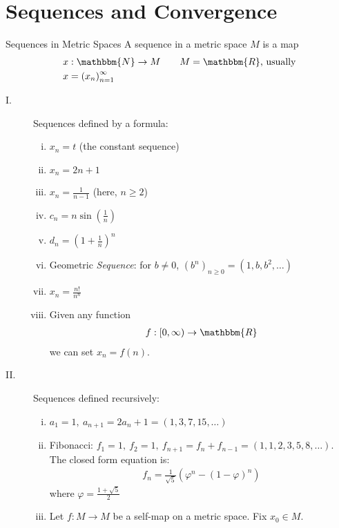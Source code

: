 \documentclass[10pt]{extarticle}
\newcommand{\N}{\mathbbm{N}}
\newcommand{\R}{\mathbbm{R}}
\begin{document}
  \section{Sequences and Convergence}%
  \begin{problem}{Sequences in Metric Spaces}
    A sequence in a metric space $M$ is a map
    \begin{align*}
      x&: \N \rightarrow M \tag*{$M = \R$, usually}\\
      x &= \left(x_n\right)_{n=1}^{\infty}
    \end{align*}
    \begin{description}
      \item[I.] Sequences defined by a formula:
        \begin{enumerate}[(i)]
          \item $x_n = t$ (the constant sequence)
          \item $x_n = 2n + 1$
          \item $x_n = \frac{1}{n-1}$ (here, $n \geq 2$)
          \item $c_n = n\sin\left(\frac{1}{n}\right)$
          \item $d_n = \left(1 + \frac{1}{n}\right)^n$
          \item Geometric \textsl{Sequence}: for $b\neq 0$, $(b^n)_{n\geq 0} = (1,b,b^2,\dots)$
          \item $x_n = \frac{n!}{n^n}$
          \item Given any function
            \begin{align*}
              f:[0,\infty)\rightarrow\R
            \end{align*}
            we can set $x_n = f(n)$.
        \end{enumerate}
      \item[II.] Sequences defined recursively:
        \begin{enumerate}[(i)]
          \item $a_1 = 1,~a_{n+1}=2a_n + 1 = (1,3,7,15,\dots)$
          \item Fibonacci: $f_1 = 1,~f_2 = 1,~f_{n+1} = f_{n} + f_{n-1} = (1,1,2,3,5,8,\dots)$. The closed form equation is:
            \begin{align*}
              f_n = \frac{1}{\sqrt{5}}\left(\varphi^n - (1-\varphi)^n\right)
            \end{align*}
            where $\varphi = \frac{1 + \sqrt{5}}{2}$
          \item Let $f: M\rightarrow M$ be a self-map on a metric space. Fix $x_0\in M$.\\


\end{enumerate}
\end{description}
\end{problem}
\end{document}
